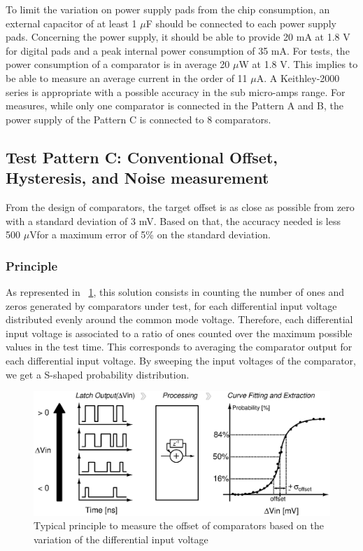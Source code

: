 To limit the variation on power supply pads from the chip consumption, an external capacitor of at least 1 $\mu$F should be connected to each power supply pads. Concerning the power supply, it should be able to provide 20 mA at 1.8 V for digital pads and a peak internal power consumption of 35 mA. For tests, the power consumption of a comparator is in average 20 $\mu$W at 1.8 V. This implies to be able to measure an average current in the order of 11 $\mu$A. A Keithley-2000 series is appropriate with a possible accuracy in the sub micro-amps range. For measures, while only one comparator is connected in the Pattern A and B, the power supply of the Pattern C is connected to 8 comparators.

\subsection{Test Pattern C: Conventional Offset, Hysteresis, and Noise measurement}
From the design of comparators, the target offset is as close as possible from zero with a standard deviation of 3 mV. Based on that, the accuracy needed is less 500 $\mu$V\footnotemark for a maximum error of 5\% on the standard deviation. 

\subsubsection{Principle}
As represented in \figurename~\ref{fig:conv_offset}, this solution consists in counting the number of ones and zeros generated by comparators under test, for each differential input voltage distributed evenly around the common mode voltage. Therefore, each differential input voltage is associated to a ratio of ones counted over the maximum possible values in the test time. This corresponds to averaging the comparator output for each differential input voltage. By sweeping the input voltages of the comparator, we get a S-shaped probability distribution.

\begin{figure}[htp]
    \centering
    \includegraphics[width=.8\textwidth]{Chapter5/Figs/comp_test/offset_conv_principle.ps}
    \caption{Typical principle to measure the offset of comparators based on the variation of the differential input voltage}
    \label{fig:conv_offset}
\end{figure}

